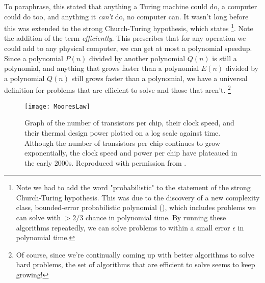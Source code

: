 To paraphrase, this stated that anything a Turing machine could do, a computer could do too, and anything
it \emph{can't} do, no computer can. It wasn't long before this was extended to the strong Church-Turing
hypothesis, which states \footnote{Note we had to add the word "probabilistic" to the statement of the strong
 Church-Turing hypothesis. This was due to the discovery of a new complexity class, bounded-error probabilistic polynomial (),
 which includes problems  we can solve with $> 2/3$ chance in polynomial time. By running these algorithms repeatedly, we can solve
 problems to within a small error $\epsilon$ in polynomial time.}.
Note the addition of the term \emph{efficiently}. This prescribes that for any
operation we could add to any physical computer, we can get at most a polynomial speedup. Since
a polynomial $P(n)$ divided by another polynomial $Q(n)$ is still a polynomial, and anything that grows faster
than a polynomial $E(n)$ divided by a polynomial $Q(n)$ still grows faster than a polynomial, we have
a universal definition for problems that are efficient to solve and those that aren't.
\footnote{Of course, since we're continually coming up with better algorithms to solve hard problems,
the set of algorithms that are efficient to solve seems to keep growing!}


\begin{figure}
  \texttt{[image: MooresLaw]}
  \caption[Moore's Law and the end of exponential scaling]
  {Graph of the number of transistors per chip, their clock speed, and their
  thermal design power plotted on a log scale against time. Although the number of transistors per chip
  continues to grow exponentially, the clock speed and power per chip have plateaued in the early 2000s.
  Reproduced with permission from \cite{cross_2016}.}
  \label{fig:mooreslaw}
\end{figure}

